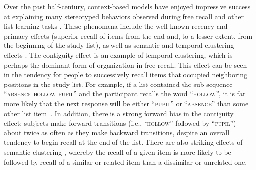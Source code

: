 Over the past half-century, context-based models have enjoyed impressive
success at explaining many stereotyped behaviors observed during free recall
and other list-learning tasks \citep[e.g.][]{Este55a, RaaiShif80, GlenEtal83,
HowaKaha02a, SiroEtal05, KimbEtal07, PolyKaha08, PolyEtalTulv, SedeEtal08,
PolyEtal09, ShanHowa12}. These phenomena include the well-known recency and
primacy effects (superior recall of items from the end and, to a lesser extent,
from the beginning of the study list), as well as semantic and temporal
clustering effects \citep[for review see][]{KahaEtal08}. The contiguity effect
is an example of temporal clustering, which is perhaps the dominant form of
organization in free recall. This effect can be seen in the tendency for people
to successively recall items that occupied neighboring positions in the study
list. For example, if a list contained the sub-sequence \textsc{``absence
hollow pupil''} and the participant recalls the word \textsc{``hollow''}, it is
far more likely that the next response will be either \textsc{``pupil''} or
\textsc{``absence''} than some other list item~\citep{Kaha96}. In addition,
there is a strong forward bias in the contiguity effect: subjects make forward
transitions (i.e., \textsc{``hollow''} followed by \textsc{``pupil''}) about
twice as often as they make backward transitions, despite an overall tendency
to begin recall at the end of the list. There are also striking effects of
semantic clustering \citep{RomnEtal93, Bous53, BousEtal54, JenkRuss52,
MannKaha12}, whereby the recall of a given item is more likely to be followed
by recall of a similar or related item than a dissimilar or unrelated one.

